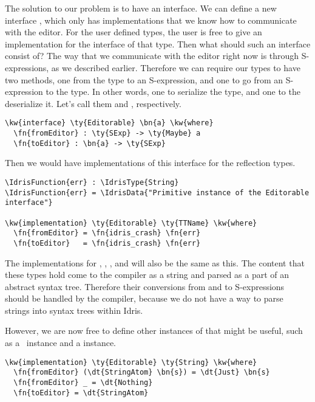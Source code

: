 The solution to our problem is to have an interface.
We can define a new interface , which only has implementations
that we know how to communicate with the editor. For the user defined types,
the user is free to give an implementation for the  interface of
that type. Then what should such an interface consist of?
The way that we communicate with the editor right now is through S-expressions,
as we described earlier. Therefore we can require our types to have two
methods, one from the type to an S-expression, and one to go from an
S-expression to the type. In other words, one to serialize the type, and one
to the deserialize it. Let's call them  and , respectively.

\begin{Verbatim}[framesep=2mm, label=\footnotesize{\normalfont{Idris}}, labelposition=topline]
\kw{interface} \ty{Editorable} \bn{a} \kw{where}
  \fn{fromEditor} : \ty{SExp} -> \ty{Maybe} a
  \fn{toEditor} : \bn{a} -> \ty{SExp}
\end{Verbatim}

Then we would have implementations of this interface for the reflection types.


\begin{Verbatim}[framesep=2mm, label=\footnotesize{\normalfont{Idris}}, labelposition=topline]
\IdrisFunction{err} : \IdrisType{String}
\IdrisFunction{err} = \IdrisData{"Primitive instance of the Editorable interface"}

\kw{implementation} \ty{Editorable} \ty{TTName} \kw{where}
  \fn{fromEditor} = \fn{idris_crash} \fn{err}
  \fn{toEditor}   = \fn{idris_crash} \fn{err}
\end{Verbatim}

The implementations for , , ,  and
 will also be the same as this.
The content that these types hold come to the compiler as a string and parsed
as a part of an abstract syntax tree. Therefore their conversions from and to
S-expressions should be handled by the compiler, because we do not have a way
to parse strings into syntax trees within Idris.

However, we are now free to define other instances of  that
might be useful, such as a \String\ instance and a  instance.

\begin{Verbatim}[framesep=2mm, label=\footnotesize{\normalfont{Idris}}, labelposition=topline]
\kw{implementation} \ty{Editorable} \ty{String} \kw{where}
  \fn{fromEditor} (\dt{StringAtom} \bn{s}) = \dt{Just} \bn{s}
  \fn{fromEditor} _ = \dt{Nothing}
  \fn{toEditor} = \dt{StringAtom}
\end{Verbatim}


